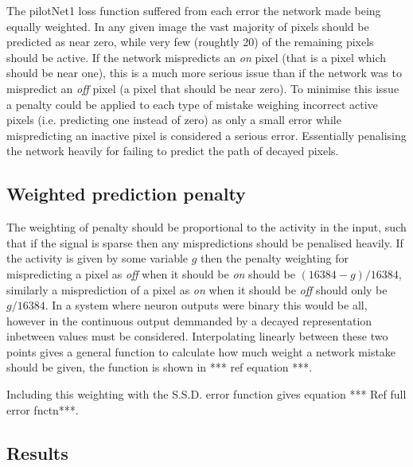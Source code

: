 The pilotNet1 loss function suffered from each error the network made being equally weighted.
In any given image the vast majority of pixels should be predicted as near zero, while very few (roughtly 20) of the remaining pixels should be active. 
If the network mispredicts an \textit{on} pixel (that is a pixel which should be near one), this is a much more serious issue than if the network was to mispredict an \textit{off} pixel (a pixel that should be near zero). 
To minimise this issue a penalty could be applied to each type of mistake weighing incorrect active pixels (i.e. predicting one instead of zero) as only a small error while mispredicting an inactive pixel is considered a serious error.
Essentially penalising the network heavily for failing to predict the path of decayed pixels. 

\subsection{Weighted prediction penalty}
The weighting of penalty should be proportional to the activity in the input, such that if the signal is sparse then any mispredictions should be penalised heavily. 
If the activity is given by some variable $g$ then the penalty weighting for mispredicting a pixel as \textit{off} when it should be \textit{on} should be $(16384 - g) / 16384$, similarly a misprediction of a pixel as \textit{on} when it should be \textit{off} should only be $g / 16384$. 
In a system where neuron outputs were binary this would be all, however in the continuous output demmanded by a decayed representation inbetween values must be considered.
Interpolating linearly between these two points gives a general function to calculate how much weight a network mistake should be given, the function is shown in *** ref equation ***.


Including this weighting with the S.S.D. error function gives equation *** Ref full error fnctn***.


\subsection{Results} 


